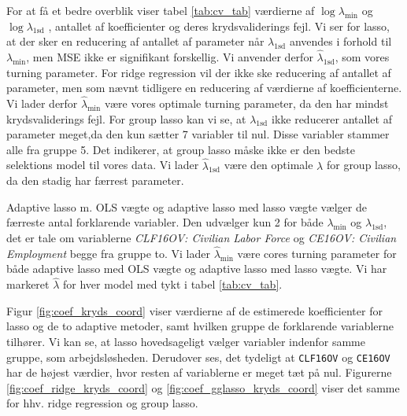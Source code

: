 

For at få et bedre overblik viser tabel  \ref{tab:cv_tab} værdierne af $\log \lambda_{\min}$ og $\log \lambda_{1\text{sd}}$ , antallet af koefficienter og deres krydsvaliderings fejl.  
Vi ser for lasso,  at der sker en reducering af antallet af parameter når $\lambda_{1\text{sd}}$ anvendes i forhold til $\lambda_{\min}$, men MSE ikke er signifikant forskellig.  
Vi anvender derfor $\widehat{\lambda}_{1\text{sd}}$, som vores turning parameter. 
For ridge regression vil der ikke ske reducering af antallet af parameter, men som nævnt tidligere en reducering af værdierne af koefficienterne. 
Vi lader derfor $\widehat{\lambda}_{\min}$ være vores optimale turning parameter, da den har mindst krydsvaliderings fejl.
%
For group lasso kan vi se, at $\lambda_{1\text{sd}}$ ikke reducerer antallet af parameter meget,da den kun sætter 7 variabler til nul. 
Disse variabler stammer alle fra gruppe 5.
Det indikerer, at group lasso måske ikke er den bedste selektions model til vores data. 
Vi lader $\widehat{\lambda}_{1\text{sd}}$ være den optimale $\lambda$ for group lasso, da den stadig har færrest parameter. 

Adaptive lasso m. OLS vægte og adaptive lasso med lasso vægte vælger de færreste antal forklarende variabler. 
Den udvælger kun 2 for både  $\lambda_{\min}$ og $\lambda_{1\text{sd}}$, det er tale om variablerne \textit{CLF16OV: Civilian Labor Force} og \textit{CE16OV: Civilian Employment} begge fra gruppe to. 
Vi lader  $\widehat{\lambda}_{\min}$ være cores turning parameter for både adaptive lasso med OLS vægte og adaptive lasso med lasso vægte. 
Vi har markeret $\widehat{\lambda}$ for hver model med tykt i tabel  \ref{tab:cv_tab}. 

Figur \ref{fig:coef_kryds_coord} viser værdierne af de estimerede koefficienter for lasso og de to adaptive metoder, samt hvilken gruppe de forklarende variablerne tilhører. 
Vi kan se, at lasso hovedsageligt vælger variabler indenfor samme gruppe, som arbejdsløsheden. 
Derudover ses, det tydeligt at \texttt{CLF16OV} og \texttt{CE16OV} har de højest værdier, hvor resten af variablerne er meget tæt på nul. 
Figurerne \ref{fig:coef_ridge_kryds_coord} og \ref{fig:coef_gglasso_kryds_coord} viser det samme for hhv. ridge regression og group lasso.    


